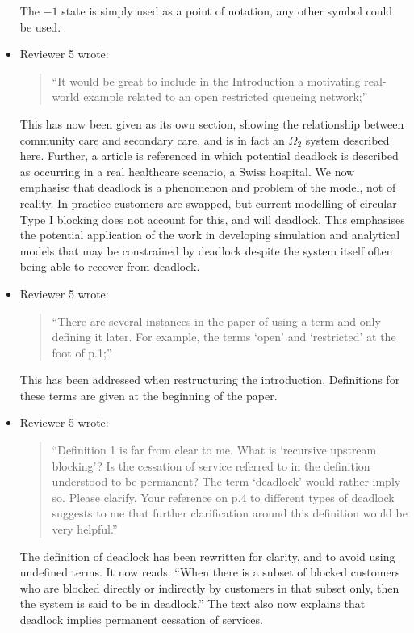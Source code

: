 \documentclass{article}
\begin{document}
\begin{itemize}
The $-1$ state is simply used as a point of notation, any other symbol could be
used.

\item Reviewer 5 wrote:
\begin{quote}
``It would be great to include in the Introduction a motivating real-world
example related to an open restricted queueing network;''
\end{quote}
This has now been given as its own section, showing the relationship between
community care and secondary care, and is in fact an $\Omega_2$ system
described here.
Further, a article is referenced in which potential deadlock is described as
occurring in a real healthcare scenario, a Swiss hospital.
We now emphasise that deadlock is a phenomenon and problem of the model, not
of reality.
In practice customers are swapped, but current modelling of circular Type I
blocking does not account for this, and will deadlock.
This emphasises the potential application of the work in developing simulation
and analytical models that may be constrained by deadlock despite the system
itself often being able to recover from deadlock.


\item Reviewer 5 wrote:
\begin{quote}
``There are several instances in the paper of using a term and only defining
it later.
For example, the terms ‘open’ and ‘restricted’ at the foot of p.1;''
\end{quote}
This has been addressed when restructuring the introduction.
Definitions for these terms are given at the beginning of the paper.

\item Reviewer 5 wrote:
\begin{quote}
``Definition 1 is far from clear to me.
What is ‘recursive upstream blocking’?
Is the cessation of service referred to in the definition understood to be
permanent?
The term ‘deadlock’ would rather imply so.
Please clarify.
Your reference on p.4 to different types of deadlock suggests to me that
further clarification around this definition would be very helpful.''
\end{quote}
The definition of deadlock has been rewritten for clarity, and to avoid using
undefined terms.
It now reads:
``When there is a subset of blocked customers who are blocked directly or
indirectly by customers in that subset only, then the system is said to
be in deadlock.''
The text also now explains that deadlock implies permanent cessation of
services.


\end{itemize}
\end{document}
